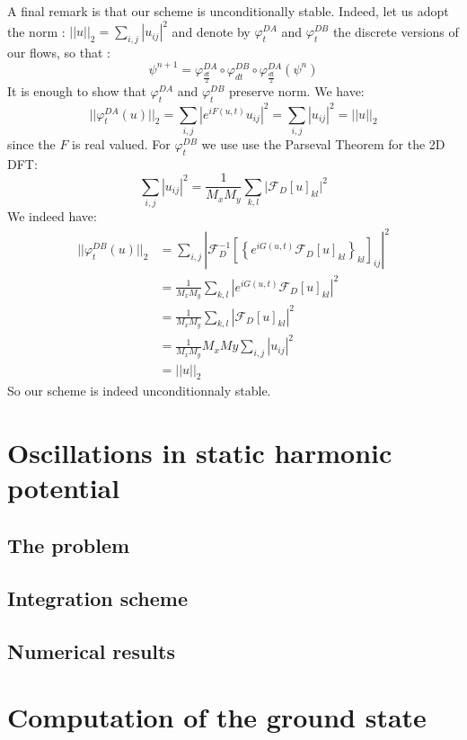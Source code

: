 \documentclass{article}
\begin{document}
A final remark is that our scheme is unconditionally stable. Indeed, let us adopt the norm : $||u||_2=\sum_{i,j}|u_{ij}|^2$ and denote by $\varphi^{DA}_t$ and $\varphi^{DB}_t$ the discrete versions of our flows, so that :
$$\psi^{n+1}=\varphi^{DA}_\frac{dt}{2}\circ\varphi^{DB}_{dt}\circ\varphi^{DA}_\frac{dt}{2}(\psi^n)$$
It is enough to show that $\varphi^{DA}_t$ and $\varphi^{DB}_t$ preserve norm. We have:
$$||\varphi^{DA}_t(u)||_2=\sum_{i,j}|e^{iF(u,t)}u_{ij}|^2=\sum_{i,j}|u_{ij}|^2=||u||_2$$
since the $F$ is real valued. For $\varphi^{DB}_t$ we use use the Parseval Theorem for the 2D DFT:
$$\sum_{i,j}|u_{ij}|^2=\frac{1}{M_x M_y}\sum_{k,l}\Bigr|\mathcal{F}_D[u]_{kl}\Bigr|^2$$
We indeed have:
\begin{equation*}
\begin{split}
   ||\varphi^{DB}_t(u)||_2&=\sum_{i,j}\left|\mathcal{F}_D^{-1}\left[\left\{e^{i G(u,t)}\mathcal{F}_D\left[u\right]_{kl}\right\}_{kl}\right]_{ij}\right|^2\\
   &=\frac{1}{M_x M_y}\sum_{k,l}\left|e^{i G(u,t)}\mathcal{F}_D\left[u\right]_{kl}\right|^2\\
   &=\frac{1}{M_x M_y}\sum_{k,l}\left|\mathcal{F}_D\left[u\right]_{kl}\right|^2\\
   &=\frac{1}{M_x M_y}M_x My\sum_{i,j}\left|u_{ij}\right|^2
   \\
   &=||u||_2
\end{split}
\end{equation*}
So our scheme is indeed unconditionnaly stable.



\section{Oscillations in static harmonic potential}\label{sec:Static}
\subsection{The problem}
\subsection{Integration scheme}
\subsection{Numerical results}

\section{Computation of the ground state}\label{sec:Ground}
\end{document}
